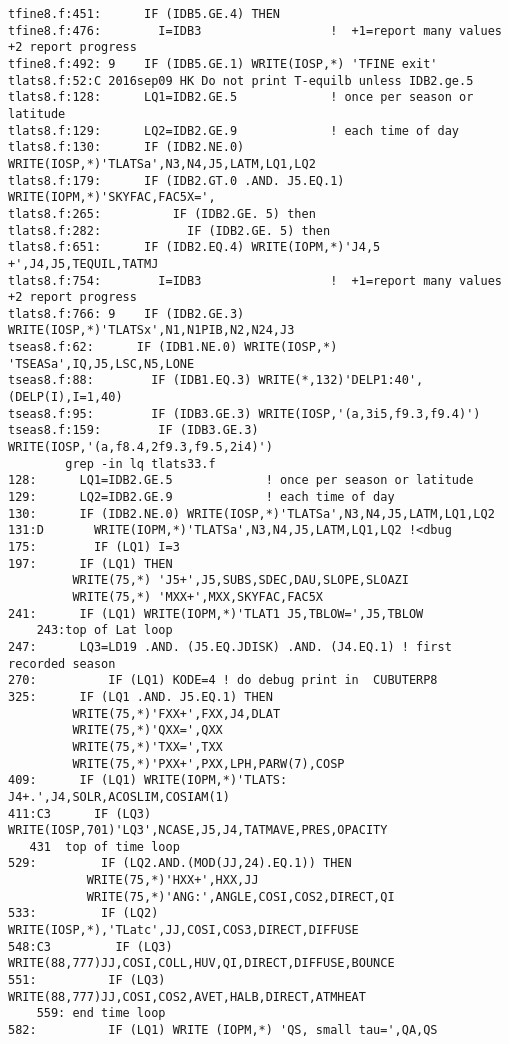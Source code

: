 \documentclass{article}
\begin{document}
\begin{verbatim}
tfine8.f:451:      IF (IDB5.GE.4) THEN
tfine8.f:476:        I=IDB3                  !  +1=report many values   +2 report progress 
tfine8.f:492: 9    IF (IDB5.GE.1) WRITE(IOSP,*) 'TFINE exit'
tlats8.f:52:C 2016sep09 HK Do not print T-equilb unless IDB2.ge.5
tlats8.f:128:      LQ1=IDB2.GE.5             ! once per season or latitude
tlats8.f:129:      LQ2=IDB2.GE.9             ! each time of day
tlats8.f:130:      IF (IDB2.NE.0) WRITE(IOSP,*)'TLATSa',N3,N4,J5,LATM,LQ1,LQ2
tlats8.f:179:      IF (IDB2.GT.0 .AND. J5.EQ.1) WRITE(IOPM,*)'SKYFAC,FAC5X=',
tlats8.f:265:          IF (IDB2.GE. 5) then
tlats8.f:282:            IF (IDB2.GE. 5) then
tlats8.f:651:      IF (IDB2.EQ.4) WRITE(IOPM,*)'J4,5 +',J4,J5,TEQUIL,TATMJ
tlats8.f:754:        I=IDB3                  !  +1=report many values   +2 report progress 
tlats8.f:766: 9    IF (IDB2.GE.3) WRITE(IOSP,*)'TLATSx',N1,N1PIB,N2,N24,J3
tseas8.f:62:      IF (IDB1.NE.0) WRITE(IOSP,*) 'TSEASa',IQ,J5,LSC,N5,LONE
tseas8.f:88:        IF (IDB1.EQ.3) WRITE(*,132)'DELP1:40',(DELP(I),I=1,40)  
tseas8.f:95:        IF (IDB3.GE.3) WRITE(IOSP,'(a,3i5,f9.3,f9.4)') 
tseas8.f:159:        IF (IDB3.GE.3) WRITE(IOSP,'(a,f8.4,2f9.3,f9.5,2i4)')
        grep -in lq tlats33.f
128:      LQ1=IDB2.GE.5             ! once per season or latitude
129:      LQ2=IDB2.GE.9             ! each time of day
130:      IF (IDB2.NE.0) WRITE(IOSP,*)'TLATSa',N3,N4,J5,LATM,LQ1,LQ2
131:D       WRITE(IOPM,*)'TLATSa',N3,N4,J5,LATM,LQ1,LQ2 !<dbug
175:        IF (LQ1) I=3
197:      IF (LQ1) THEN
         WRITE(75,*) 'J5+',J5,SUBS,SDEC,DAU,SLOPE,SLOAZI
         WRITE(75,*) 'MXX+',MXX,SKYFAC,FAC5X
241:      IF (LQ1) WRITE(IOPM,*)'TLAT1 J5,TBLOW=',J5,TBLOW
    243:top of Lat loop
247:      LQ3=LD19 .AND. (J5.EQ.JDISK) .AND. (J4.EQ.1) ! first recorded season
270:          IF (LQ1) KODE=4 ! do debug print in  CUBUTERP8
325:      IF (LQ1 .AND. J5.EQ.1) THEN
         WRITE(75,*)'FXX+',FXX,J4,DLAT
         WRITE(75,*)'QXX=',QXX 
         WRITE(75,*)'TXX=',TXX
         WRITE(75,*)'PXX+',PXX,LPH,PARW(7),COSP
409:      IF (LQ1) WRITE(IOPM,*)'TLATS: J4+.',J4,SOLR,ACOSLIM,COSIAM(1)
411:C3      IF (LQ3) WRITE(IOSP,701)'LQ3',NCASE,J5,J4,TATMAVE,PRES,OPACITY
   431  top of time loop
529:         IF (LQ2.AND.(MOD(JJ,24).EQ.1)) THEN
           WRITE(75,*)'HXX+',HXX,JJ
           WRITE(75,*)'ANG:',ANGLE,COSI,COS2,DIRECT,QI
533:         IF (LQ2) WRITE(IOSP,*),'TLatc',JJ,COSI,COS3,DIRECT,DIFFUSE 
548:C3         IF (LQ3) WRITE(88,777)JJ,COSI,COLL,HUV,QI,DIRECT,DIFFUSE,BOUNCE
551:          IF (LQ3) WRITE(88,777)JJ,COSI,COS2,AVET,HALB,DIRECT,ATMHEAT
    559: end time loop
582:          IF (LQ1) WRITE (IOPM,*) 'QS, small tau=',QA,QS

\end{verbatim}
\end{document}
